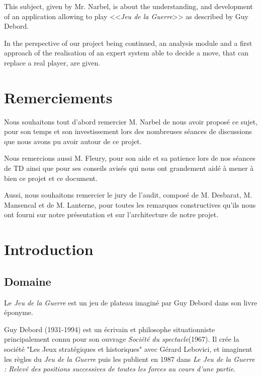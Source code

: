 \documentclass[a4paper]{report}
\begin{document}
This subject, given by Mr. Narbel, is about the understanding, and development of an application allowing to play <<\textit{Jeu de la Guerre}>> as described by Guy Debord.

In the perspective of our project being continued, an analysis module and a first approach of the realisation of an expert system able to decide a move, that can replace a real player, are given.

\vspace*{\fill}



\chapter*{Remerciements}
\setlength{\parskip}{0.5em}
Nous souhaitons tout d'abord remercier M. Narbel de nous avoir proposé ce sujet, pour son temps et son investissement lors des nombreuses séances de discussions que nous avons pu avoir autour de ce projet. 

Nous remercions aussi M. Fleury, pour son aide et sa patience lors de nos séances de TD ainsi que pour ses conseils avisés qui nous ont grandement aidé à mener à bien ce projet et ce document.

Aussi, nous souhaitons remercier le jury de l'audit, composé de M. Desbarat, M. Mansencal et de M. Lanterne, pour toutes les remarques constructives qu'ils nous ont fourni sur notre présentation et sur l'architecture de notre projet.


\setlength{\parskip}{0.0em}
\tableofcontents

\setlength{\parskip}{0.5em}

\chapter{Introduction}
\section{Domaine}

Le {\it Jeu de la Guerre}\cite{jdg} est un jeu de plateau imaginé par Guy Debord dans son livre éponyme. 

Guy Debord (1931-1994) est un écrivain et philosophe situationniste principalement connu pour son ouvrage {\it Société du spectacle}(1967). Il crée la société "Les Jeux stratégiques et historiques" avec Gérard Lebovici, et imaginent les règles du \textit{Jeu de la Guerre} puis les publient en 1987 dans {\it Le Jeu de la Guerre : Relevé des positions successives de toutes les forces au cours d'une partie}\cite{jdg}.
\end{document}
